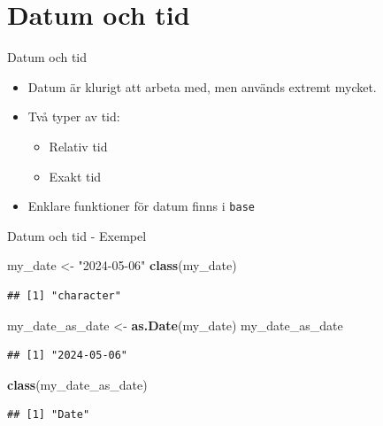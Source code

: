\documentclass[
  11pt,
  ignorenonframetext,
  handout]{beamer}
\newenvironment{Shaded}{\begin{snugshade}}{\end{snugshade}}
\newcommand{\FunctionTok}[1]{\textcolor[rgb]{0.13,0.29,0.53}{\textbf{#1}}}
\newcommand{\NormalTok}[1]{#1}
\newcommand{\OtherTok}[1]{\textcolor[rgb]{0.56,0.35,0.01}{#1}}
\newcommand{\StringTok}[1]{\textcolor[rgb]{0.31,0.60,0.02}{#1}}
\providecommand{\tightlist}{%
  \setlength{\itemsep}{0pt}\setlength{\parskip}{0pt}}
\begin{document}
\section{Datum och tid}\label{datum-och-tid}

\begin{frame}{Datum och tid}
\protect{}\label{datum-och-tid-1}
\begin{itemize}
\tightlist
\item
  Datum är klurigt att arbeta med, men används extremt mycket.
\item
  Två typer av tid:

  \begin{itemize}
  \tightlist
  \item
    Relativ tid
  \item
    Exakt tid
  \end{itemize}
\item
  Enklare funktioner för datum finns i \texttt{base}
\end{itemize}
\end{frame}

\begin{frame}[fragile]{Datum och tid - Exempel}
\protect{}\label{datum-och-tid---exempel}
\begin{Shaded}
\begin{Highlighting}[]
\NormalTok{my\_date }\OtherTok{\textless{}{-}} \StringTok{"2024{-}05{-}06"}
\FunctionTok{class}\NormalTok{(my\_date)}
\end{Highlighting}
\end{Shaded}

\begin{verbatim}
## [1] "character"
\end{verbatim}

\begin{Shaded}
\begin{Highlighting}[]
\NormalTok{my\_date\_as\_date }\OtherTok{\textless{}{-}} \FunctionTok{as.Date}\NormalTok{(my\_date)}
\NormalTok{my\_date\_as\_date}
\end{Highlighting}
\end{Shaded}

\begin{verbatim}
## [1] "2024-05-06"
\end{verbatim}

\begin{Shaded}
\begin{Highlighting}[]
\FunctionTok{class}\NormalTok{(my\_date\_as\_date)}
\end{Highlighting}
\end{Shaded}

\begin{verbatim}
## [1] "Date"
\end{verbatim}
\end{frame}
\end{document}
